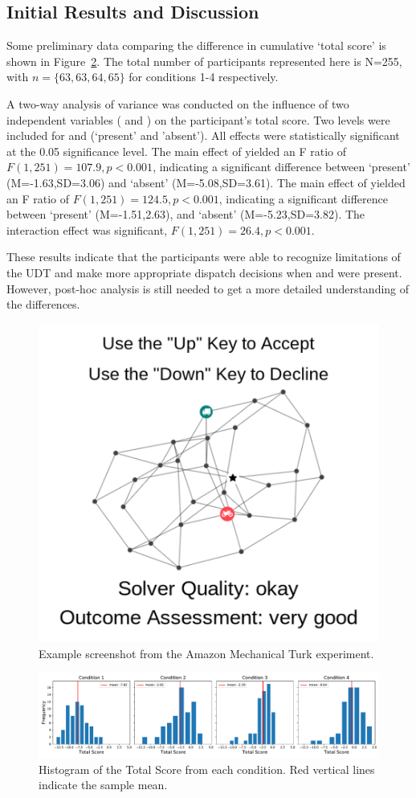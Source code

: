 \subsection{Initial Results and Discussion}
Some preliminary data comparing the difference in cumulative `total score' is shown in Figure~\ref{fig:total_score}. The total number of participants represented here is N=255, with $n=\{63,63,64,65\}$ for conditions 1-4 respectively. 

A two-way analysis of variance was conducted on the influence of two independent variables (\xQ{} and \xO) on the participant's total score. Two levels were included for \xQ{} and \xO{} (`present' and 'absent'). All effects were statistically significant at the 0.05 significance level. The main effect of \xQ{} yielded an F ratio of $F(1,251)=107.9,p<0.001$, indicating a significant difference between \xQ `present' (M=-1.63,SD=3.06) and `absent' (M=-5.08,SD=3.61). The main effect of \xO{} yielded an F ratio of $F(1,251)=124.5,p<0.001$, indicating a significant difference between \xO{} `present' (M=-1.51,2.63), and `absent' (M=-5.23,SD=3.82). The interaction effect was significant, $F(1,251)=26.4,p<0.001$.

These results indicate that the participants were able to recognize limitations of the UDT and make more appropriate dispatch decisions when \xQ{} and \xO{} were present. However, post-hoc analysis is still needed to get a more detailed understanding of the differences.

\begin{figure}[tbp]
    \centering
    \includegraphics[width=0.45\linewidth]{Figures/experiment_screenshot_Compressed.png}
    \caption{Example screenshot from the Amazon Mechanical Turk experiment.} 
    \label{fig:experiment_screenshot}
\end{figure}

\begin{figure}[tbp]
    \centering
    \includegraphics[width=1.0\linewidth]{Figures/total_score.pdf}
    \caption{Histogram of the Total Score from each condition. Red vertical lines indicate the sample mean.}
    \label{fig:total_score}
\end{figure}

